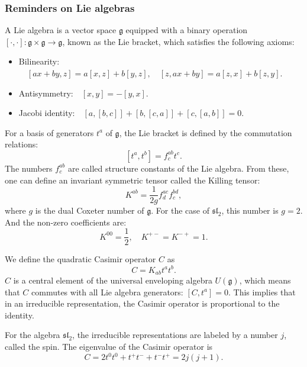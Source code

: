\documentclass[10pt,a4paper]{article}
\numberwithin{equation}{section}
\begin{document}
\subsubsection*{Reminders on Lie algebras}
A Lie algebra is a vector space $\mathfrak{g}$ equipped with a binary operation $\left[\cdot,\cdot \right]:\mathfrak{g}\times \mathfrak{g} \rightarrow \mathfrak{g}$,
known as the Lie bracket, which satisfies the following axioms:
\begin{itemize}
    \item Bilinearity:$\quad \left[ax+by,z \right] = a \left[x,z\right] + b \left[y,z\right],\quad \left[z,ax+by \right] = a \left[z,x\right] + b \left[z,y\right]$.
    \item Antisymmetry:$\quad \left[x,y\right] = - \left[y,x\right]$.
    \item Jacobi identity:$\quad \left[a,\left[b,c\right]\right]+\left[b,\left[c,a\right]\right]+\left[c,\left[a,b\right]\right] = 0$.
\end{itemize}
For a basis of generators $t^{a}$ of $\mathfrak{g}$, the Lie bracket is defined by the commutation relations:
\begin{equation}
    \left[t^{a},t^{b}\right] = f^{ab}_{c} t^{c}.
\end{equation}
The numbers $f^{ab}_{c}$ are called structure constants of the Lie algebra. From these, one can define an invariant symmetric tensor 
called the Killing tensor: 
\begin{equation}
    K^{ab} = \frac{1}{2g} f^{ac}_{d}f^{bd}_{c},
\end{equation}
where $g$ is the dual Coxeter number of $\mathfrak{g}$. For the case of $\mathfrak{sl}_{2}$, this number is $g = 2$. And the non-zero 
coefficients are:
\begin{equation}
    K^{00} = \frac{1}{2}, \quad K^{+-} = K^{-+} = 1.
\end{equation}

We define the quadratic Casimir operator $C$ as 
\begin{equation}
    C = K_{ab} t^{a} t^{b}.
\end{equation}
$C$ is a central element of the universal enveloping algebra $U(\mathfrak{g})$, which means that 
$C$ commutes with all Lie algebra generators: $\left[C,t^{a}\right] = 0$. This implies that in an irreducible representation, 
the Casimir operator is proportional to the identity. 

For the algebra $\mathfrak{sl}_{2}$, the irreducible representations are labeled by a number $j$, called the spin. 
The eigenvalue of the Casimir operator is 
\begin{equation}
    C = 2 t^{0} t^{0} + t^{+} t^{-} + t^{-} t^{+} = 2j(j+1).
\end{equation}
\end{document}
